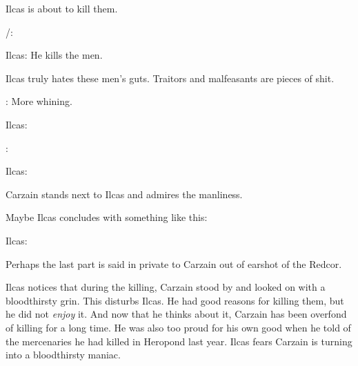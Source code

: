 Ilcas is about to kill them. 

\begin{prose}
  \Racel/\Esmerel: 
  
  Ilcas: 
  He kills the men. 
\end{prose}

Ilcas truly hates these men's guts. 
Traitors and malfeasants are pieces of shit. 

\begin{prose}
  \Esmerel: More whining. 
  
  Ilcas: 
  
  \Esmerel: 
  
  Ilcas: 
\end{prose}

Carzain stands next to Ilcas and admires the manliness. 

Maybe Ilcas concludes with something like this: 

\begin{prose}
  Ilcas: 
\end{prose}

Perhaps the last part is said in private to Carzain out of earshot of the Redcor. 

Ilcas notices that during the killing, Carzain stood by and looked on with a bloodthirsty grin. 
This disturbs Ilcas. 
He had good reasons for killing them, but he did not \emph{enjoy} it. 
And now that he thinks about it, Carzain has been overfond of killing for a long time. 
He was also too proud for his own good when he told of the mercenaries he had killed in Heropond last year. 
Ilcas fears Carzain is turning into a bloodthirsty maniac. 





